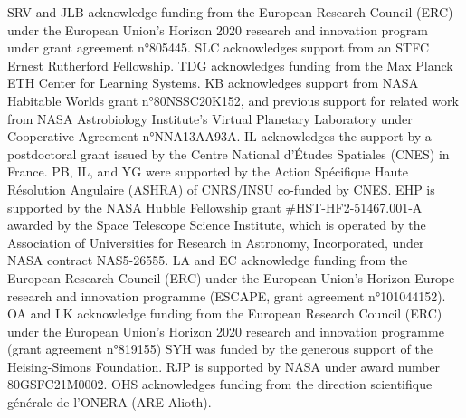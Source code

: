 \documentclass[usenatbib]{mnras}
\begin{document}
SRV and JLB acknowledge funding from the European Research Council (ERC) under the European Union’s Horizon 2020 research and innovation program under grant agreement n°805445.
SLC acknowledges support from an STFC Ernest Rutherford Fellowship. 
TDG acknowledges funding from the Max Planck ETH Center for Learning Systems.
KB acknowledges support from NASA Habitable Worlds grant n°80NSSC20K152, and previous support for related work from NASA Astrobiology Institute's Virtual Planetary Laboratory under Cooperative Agreement n°NNA13AA93A.
IL acknowledges the support by a postdoctoral grant issued by the Centre National d'Études Spatiales (CNES) in France.
PB, IL, and YG were supported by the Action Spécifique Haute Résolution Angulaire (ASHRA) of CNRS/INSU co-funded by CNES.
EHP is supported by the NASA Hubble Fellowship grant \#HST-HF2-51467.001-A awarded by the Space Telescope Science Institute, which is operated by the Association of Universities for Research in Astronomy, Incorporated, under NASA contract NAS5-26555.
LA and EC acknowledge funding from the European Research Council (ERC) under the European Union's Horizon Europe research and innovation programme (ESCAPE, grant agreement n°101044152).
OA and LK acknowledge funding from the European Research Council (ERC) under the European Union’s Horizon 2020 research and innovation programme (grant agreement n°819155)
SYH was funded by the generous support of the Heising-Simons Foundation.
RJP is supported by NASA under award number 80GSFC21M0002.
OHS acknowledges funding from the direction scientifique générale de l'ONERA (ARE Alioth).











\end{document}

